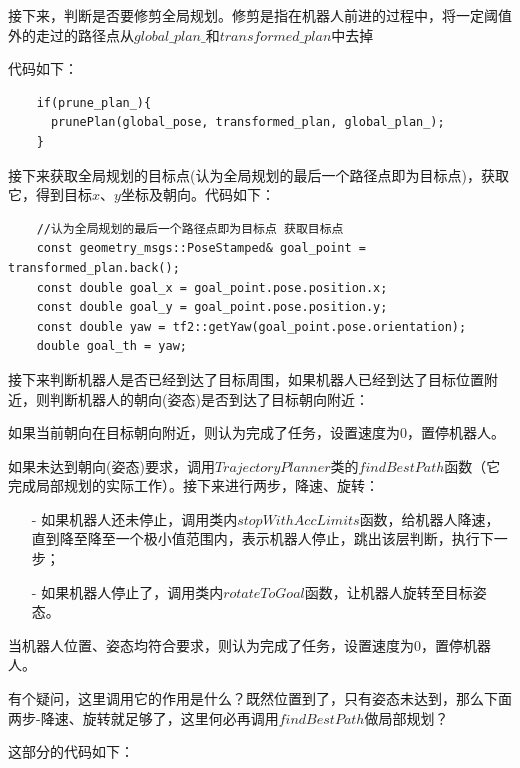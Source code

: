 \documentclass[9pt, oneside]{book}
\begin{document}
接下来，判断是否要修剪全局规划。修剪是指在机器人前进的过程中，将一定阈值外的走过的路径点从$global\_plan\_$和$transformed\_plan$中去掉

代码如下：

\small
\begin{verbatim}
    if(prune_plan_){
      prunePlan(global_pose, transformed_plan, global_plan_);
    }
\end{verbatim}
\normalsize

接下来获取全局规划的目标点(认为全局规划的最后一个路径点即为目标点)，获取它，得到目标$x$、$y$坐标及朝向。代码如下：

\small
\begin{verbatim}
    //认为全局规划的最后一个路径点即为目标点 获取目标点
    const geometry_msgs::PoseStamped& goal_point = transformed_plan.back();
    const double goal_x = goal_point.pose.position.x;
    const double goal_y = goal_point.pose.position.y;
    const double yaw = tf2::getYaw(goal_point.pose.orientation);
    double goal_th = yaw;
\end{verbatim}
\normalsize

接下来判断机器人是否已经到达了目标周围，如果机器人已经到达了目标位置附近，则判断机器人的朝向(姿态)是否到达了目标朝向附近：

如果当前朝向在目标朝向附近，则认为完成了任务，设置速度为0，置停机器人。

如果未达到朝向(姿态)要求，调用$TrajectoryPlanner$类的$findBestPath$函数（它完成局部规划的实际工作）。接下来进行两步，降速、旋转：

\begin{itemize}
    \item [-] 如果机器人还未停止，调用类内$stopWithAccLimits$函数，给机器人降速，直到降至降至一个极小值范围内，表示机器人停止，跳出该层判断，执行下一步；
    \item [-] 如果机器人停止了，调用类内$rotateToGoal$函数，让机器人旋转至目标姿态。
\end{itemize}

当机器人位置、姿态均符合要求，则认为完成了任务，设置速度为0，置停机器人。

\textcolor[rgb]{1,0,0}{有个疑问，这里调用它的作用是什么？既然位置到了，只有姿态未达到，那么下面两步-降速、旋转就足够了，这里何必再调用$findBestPath$做局部规划？}

这部分的代码如下：
\end{document}
